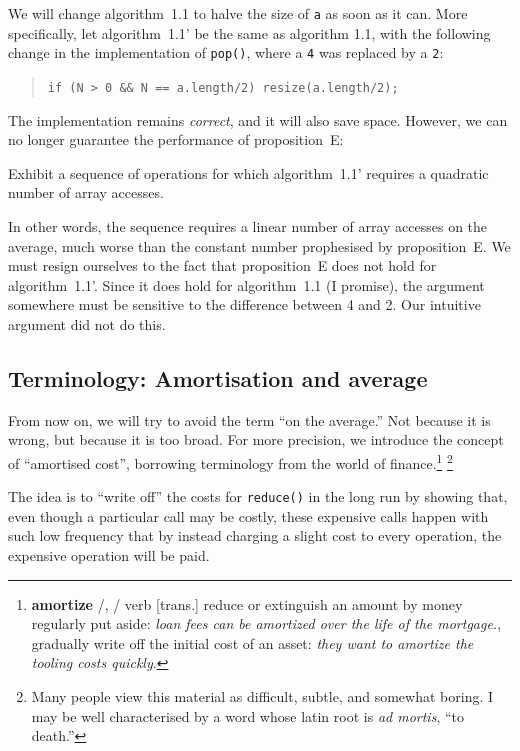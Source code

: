 \documentclass{tufte-handout}
\begin{document}
We will change algorithm~1.1 to halve the size of {\tt a} as soon as
it can.  
More specifically, let algorithm~1.1' be the same as algorithm 1.1,
with the following change in the implementation of {\tt pop()}, where
a {\tt 4} was replaced by a {\tt 2}:

\begin{quote}
  {\tt if (N > 0 \&\& N == a.length/2) resize(a.length/2);}
\end{quote}
   
The implementation remains \emph{correct}, and it will also save
space. 
However, we can no longer guarantee the performance of proposition~E:

\begin{ExerciseList}\small
  \Exercise Exhibit a sequence of operations for which
  algorithm~1.1' requires a quadratic number of array accesses.
\end{ExerciseList}

In other words, the sequence requires a linear number of array
accesses on the average, much worse than the constant number
prophesised by proposition~E. 
We must resign ourselves to the fact that proposition~E does not hold
for algorithm~1.1'.
Since it does hold for algorithm~1.1 (I promise), the argument
somewhere must be sensitive to the difference between 4 and 2.
Our intuitive argument did not do this.

\subsection{Terminology: Amortisation and average}

From now on, we will try to avoid the term ``on the average.'' 
Not because it is wrong, but because it is too broad.
For more precision, we introduce the concept of ``amortised cost'',
borrowing terminology from the world of finance.\footnote{
{\bf amortize} 
/, /
verb [trans.]
reduce or extinguish an amount by money regularly put aside:
\emph{loan fees can be amortized over the life of the mortgage.}, gradually write off the initial cost of an asset: \emph{they want to amortize the tooling costs quickly}.
}
\footnote{Many people view this material as  difficult, subtle, and somewhat
boring. I may be well
characterised by a word whose latin root is \emph{ad mortis}, ``to death.''}

The idea is to ``write off'' the costs for {\tt reduce()} in the long
run by showing that, even though a particular call may be costly,
these expensive calls happen with such low frequency that by instead
charging a slight cost to every operation, the expensive operation
will be paid.
\end{document}
